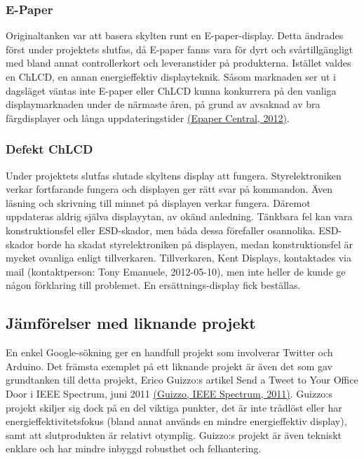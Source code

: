 \documentclass[a4paper,11pt]{article}
\begin{document}
\subsubsection{E-Paper}
Originaltanken var att basera skylten runt en E-paper-display. Detta ändrades först under projektets slutfas, då E-paper fanns vara för dyrt och svårtillgängligt med bland annat controllerkort och leveranstider på produkterna. Istället valdes en ChLCD, en annan energieffektiv displayteknik. Såsom marknaden ser ut i dagsläget väntas inte E-paper eller ChLCD kunna konkurrera på den vanliga displaymarknaden under de närmaste åren, på grund av avsaknad av bra färgdisplayer och långa uppdateringstider \hyperref[epapercentral]{(Epaper Central, 2012)}.

\subsubsection{Defekt ChLCD}
Under projektets slutfas slutade skyltens display att fungera. Styrelektroniken verkar fortfarande fungera och displayen ger rätt svar på kommandon. Även läsning och skrivning till minnet på displayen verkar fungera. Däremot uppdateras aldrig själva displayytan, av okänd anledning. Tänkbara fel kan vara konstruktionsfel eller ESD-skador, men båda dessa förefaller osannolika. ESD-skador borde ha skadat styrelektroniken på displayen, medan konstruktionsfel är mycket ovanliga enligt tillverkaren. Tillverkaren, Kent Displays, kontaktades via mail (kontaktperson: Tony Emanuele, 2012-05-10), men inte heller de kunde ge någon förklaring till problemet. En ersättnings-display fick beställas.

\subsection{Jämförelser med liknande projekt}
En enkel Google-sökning ger en handfull projekt som involverar Twitter och Arduino. Det främsta exemplet på ett liknande projekt är även det som gav grundtanken till detta projekt, Erico Guizzo:s artikel Send a Tweet to Your Office Door i IEEE Spectrum, juni 2011 \hyperref[spectrum]{(Guizzo, IEEE Spectrum, 2011)}. Guizzo:s projekt skiljer sig dock på en del viktiga punkter, det är inte trådlöst eller har energieffektivitetsfokus (bland annat används en mindre energieffektiv display), samt att slutprodukten är relativt otymplig. Guizzo:s projekt är även tekniskt enklare och har mindre inbyggd robusthet och felhantering. \\
\end{document}
